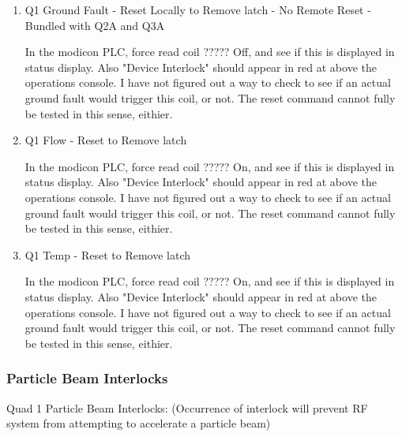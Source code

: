 \documentclass[11pt]{book}		%
\begin{document}
\begin{enumerate}
 \item Q1 Ground Fault - Reset Locally to Remove latch - No Remote Reset - Bundled with Q2A and Q3A

\color{red}
In the modicon PLC, force read coil ????? Off, and see if this is displayed in status display. Also "Device Interlock" should appear in red at above the operations console. I have not figured out a way to check to see if an actual ground fault would trigger this coil, or not. The reset command cannot fully be tested in this sense, eithier.
\color{black}

 \item Q1 Flow - Reset to Remove latch

\color{red}
In the modicon PLC, force read coil ????? On, and see if this is displayed in status display. Also "Device Interlock" should appear in red at above the operations console. I have not figured out a way to check to see if an actual ground fault would trigger this coil, or not. The reset command cannot fully be tested in this sense, eithier.
\color{black}

 \item Q1 Temp - Reset to Remove latch

\color{red}
In the modicon PLC, force read coil ????? On, and see if this is displayed in status display. Also "Device Interlock" should appear in red at above the operations console. I have not figured out a way to check to see if an actual ground fault would trigger this coil, or not. The reset command cannot fully be tested in this sense, eithier.
\color{black}

\end{enumerate}

\subsubsection{Particle Beam Interlocks}\label{sect:cyc-equip-ctl-beamline-quad1-state-monitors-beam-interlocks}

Quad 1 Particle Beam Interlocks:
(Occurrence of interlock will prevent RF system from attempting to accelerate a particle beam)
\end{document}
